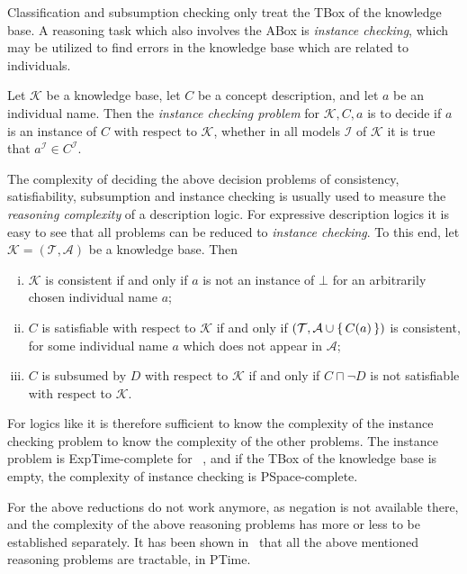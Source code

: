 Classification and subsumption checking only treat the TBox of the knowledge base.  A
reasoning task which also involves the ABox is \emph{instance checking}, which may be
utilized to find errors in the knowledge base which are related to individuals.

\begin{Definition}
  \label{def:instance-checking}
  Let $\mathcal{K}$ be a knowledge base, let $C$ be a concept description, and let $a$ be
  an individual name.  Then the \emph{instance checking problem} for $\mathcal{K}, C, a$
  is to decide if $a$ is an instance of $C$ with respect to $\mathcal{K}$, \ie whether in
  all models $\mathcal{I}$ of $\mathcal{K}$ it is true that $a^{\mathcal{I}} \in
  C^{\mathcal{I}}$.
\end{Definition}

The complexity of deciding the above decision problems of consistency, satisfiability,
subsumption and instance checking is usually used to measure the \emph{reasoning
  complexity} of a description logic.  For expressive description logics it is easy to see
that all problems can be reduced to \emph{instance checking}.  To this end, let
$\mathcal{K} = (\mathcal{T}, \mathcal{A})$ be a knowledge base.  Then
\begin{enumerate}[i. ]
\item $\mathcal{K}$ is consistent if and only if $a$ is not an instance of $\bot$ for an
  arbitrarily chosen individual name $a$;
\item $C$ is satisfiable with respect to $\mathcal{K}$ if and only if $(\mathcal{T},
  \mathcal{A} \cup {\ensuremath{\{\, C(a) \,\}}} )$ is consistent, for some individual name $a$ which does
  not appear in $\mathcal{A}$;
\item $C$ is subsumed by $D$ with respect to $\mathcal{K}$ if and only if $C \sqcap \neg
  D$ is not satisfiable with respect to $\mathcal{K}$.
\end{enumerate}
For logics like \ALC it is therefore sufficient to know the complexity of the instance
checking problem to know the complexity of the other problems.  The instance problem is
ExpTime-complete for \ALC~\cite{DLhandbook}, and if the TBox of the knowledge base is
empty, the complexity of instance checking is PSpace-complete.

For \ELbot the above reductions do not work anymore, as negation is not available there,
and the complexity of the above reasoning problems has more or less to be established
separately.  It has been shown in~\cite{DBLP:conf/ijcai/Baader03a,
  DBLP:conf/ecai/Brandt04, DBLP:conf/ijcai/BaaderBL05} that all the above mentioned
reasoning problems are tractable, \ie in PTime.

